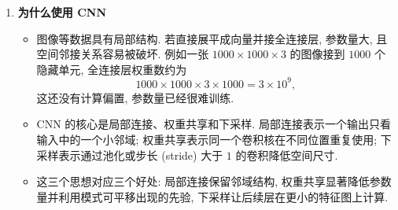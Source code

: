 \documentclass{../nndlcourse}
\begin{document}
\begin{enumerate}
    \item \textbf{为什么使用 CNN}
    \begin{itemize}
        \item 图像等数据具有局部结构. 若直接展平成向量并接全连接层, 参数量大, 且空间邻接关系容易被破坏. 例如一张 $1000\times1000\times3$ 的图像接到 $1000$ 个隐藏单元, 全连接层权重数约为
        \[
            1000\times1000\times3\times1000
            =
            3\times10^9,
        \]
        这还没有计算偏置, 参数量已经很难训练.
        \item CNN 的核心是局部连接、权重共享和下采样. 局部连接表示一个输出只看输入中的一个小邻域; 权重共享表示同一个卷积核在不同位置重复使用; 下采样表示通过池化或步长 (stride) 大于 $1$ 的卷积降低空间尺寸.
        \item 这三个思想对应三个好处: 局部连接保留邻域结构, 权重共享显著降低参数量并利用模式可平移出现的先验, 下采样让后续层在更小的特征图上计算.
    \end{itemize}


\end{enumerate}
\end{document}

